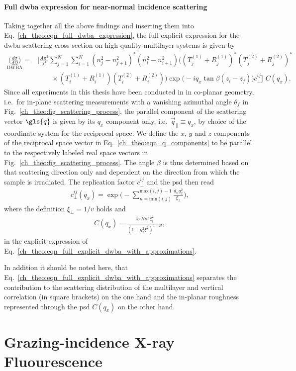 \paragraph{Full \gls{dwba} expression for near-normal incidence scattering}
Taking together all the above findings and inserting them into Eq.~\eqref{ch_theo:eqn_full_dwba_expression}, the full explicit expression for the \gls{dwba} scattering cross section on high-quality multilayer systems is given by
    \begin{align}
        {\underset{\text{DWBA}}{\Big(\frac{d \sigma}{d \Omega}\Big)}} = &\Bigg[\frac{A \pi^2}{\lambda^4}\sum \limits_{j=1}^{N}\sum \limits_{i=1}^{N} (n_j^2 - n_{j+1}^2)^* (n_i^2 - n_{i+1}^2)\Big( (T^{(1)}_j + R^{(1)}_j)^* (T^{(2)}_j + R^{(2)}_j)^* \nonumber \\ &\qquad\times(T^{(1)}_i + R^{(1)}_i) (T^{(2)}_i + R^{(2)}_i) \Big) \exp\Big(-i q_x \tan \beta (z_i-z_j)\Big) c_\perp^{i j}\Bigg]\,\, C(q_x) \text{.} \label{ch_theo:eqn_full_explicit_dwba_with_approximations}
    \end{align}
Since all experiments in this thesis have been conducted in in co-planar geometry, i.e.~for in-plane scattering measurements with a vanishing azimuthal angle $\theta_f$ in Fig.~\ref{ch_theo:fig_scattering_process}, the parallel component of the scattering vector $\gls{q}$ is given by its $q_x$ component only, i.e.~$\vec{q}_\parallel \equiv q_x$, by choice of the coordinate system for the reciprocal space. We define the $x$, $y$ and $z$ components of the reciprocal space vector in Eq.~\eqref{ch_theo:eqn_q_components} to be parallel to the respectively labeled real space vectors in Fig.~\ref{ch_theo:fig_scattering_process}. The angle $\beta$ is thus determined based on that scattering direction only and dependent on the direction from which the sample is irradiated. The replication factor $c_\perp^{i j}$ and the \gls{psd} then read
\begin{align}
c_\perp^{i j}(q_x) =  \exp\Bigg(-\sum \limits_{n = \text{min}(i,j)}^{\text{max}(i,j)-1}\frac{d_n q_x^2}{\xi_\perp} \Bigg)\text{,}
\end{align}
where the definition $\xi_\perp = 1/v$ holds and
\begin{align}
C(q_x) = \frac{4 \pi H \sigma^2 \xi_\parallel^2}{(1+q_x^2\xi_\parallel^2)^{1+H}} \text{,}
\end{align}
in the explicit expression of Eq.~\eqref{ch_theo:eqn_full_explicit_dwba_with_approximations}.

In addition it should be noted here, that Eq.~\eqref{ch_theo:eqn_full_explicit_dwba_with_approximations} separates the contribution to the scattering distribution of the multilayer and vertical correlation (in square brackets) on the one hand and the in-planar roughness represented through the \gls{psd} $C(q_x)$ on the other hand.

\section{Grazing-incidence X-ray Fluourescence}
\cite{sherman_theoretical_1955, shiraiwa_theoretical_1966, de_boer_glancing-incidence_1991}
